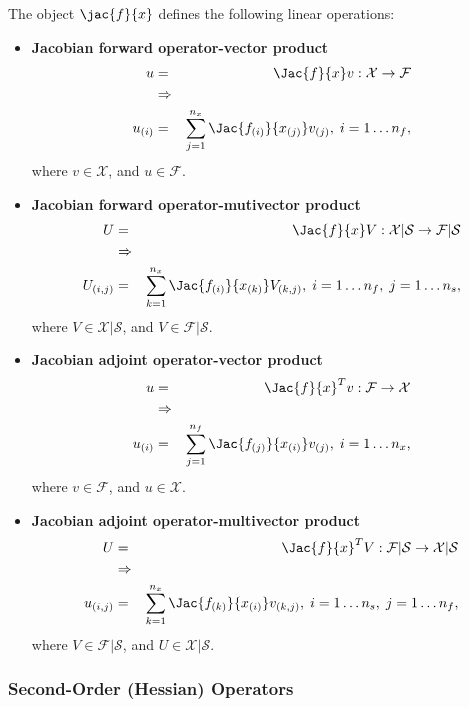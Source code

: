 \documentclass[pdf,ps2pdf,11pt]{SANDreport}
\begin{document}
The object $\jac{f}{x}$ defines the following linear operations:
%
\begin{itemize}
%
{}\item \textbf{Jacobian forward operator-vector product}
%
\begin{eqnarray*}
u & = & \Jac{f}{x} v : \mathcal{X} \rightarrow \mathcal{F} \\
& \Rightarrow & \\
u_{(i)} & = & \sum_{j=1}^{n_x} \Jac{f_{(i)}}{x_{(j)}} v_{(j)}, \; i = 1 \ldots n_f,
\end{eqnarray*}
%
where $v\in\mathcal{X}$, and $u\in\mathcal{F}$.
%
{}\item \textbf{Jacobian forward operator-mutivector product}
%
\begin{eqnarray*}
U & = & \Jac{f}{x} V : \mathcal{X}|\mathcal{S} \rightarrow \mathcal{F}|\mathcal{S} \\
& \Rightarrow & \\
U_{(i,j)} & = & \sum_{k=1}^{n_x} \Jac{f_{(i)}}{x_{(k)}} V_{(k,j)}, \; i = 1 \ldots n_f, \; j = 1 \ldots n_s,
\end{eqnarray*}
%
where $V\in\mathcal{X}|\mathcal{S}$, and $V\in\mathcal{F}|\mathcal{S}$.
%
{}\item\textbf{Jacobian adjoint operator-vector product}
%
\begin{eqnarray*}
u & = & \Jac{f}{x}^T v : \mathcal{F} \rightarrow \mathcal{X} \\
& \Rightarrow & \\
u_{(i)} & = & \sum_{j=1}^{n_f} \Jac{f_{(j)}}{x_{(i)}} v_{(j)}, \; i = 1 \ldots n_x,
\end{eqnarray*}
%
where $v\in\mathcal{F}$, and $u\in\mathcal{X}$.
%
{}\item\textbf{Jacobian adjoint operator-multivector product}
%
\begin{eqnarray*}
U & = & \Jac{f}{x}^T V : \mathcal{F}|\mathcal{S} \rightarrow \mathcal{X}|\mathcal{S} \\
& \Rightarrow & \\
u_{(i,j)} & = & \sum_{k=1}^{n_x} \Jac{f_{(k)}}{x_{(i)}} v_{(k,j)}, \; i = 1 \ldots n_s, \; j = 1 \ldots n_f,
\end{eqnarray*}
%
where $V\in\mathcal{F}|\mathcal{S}$, and $U\in\mathcal{X}|\mathcal{S}$.
%
\end{itemize}

\subsubsection{Second-Order (Hessian) Operators}
\end{document}
